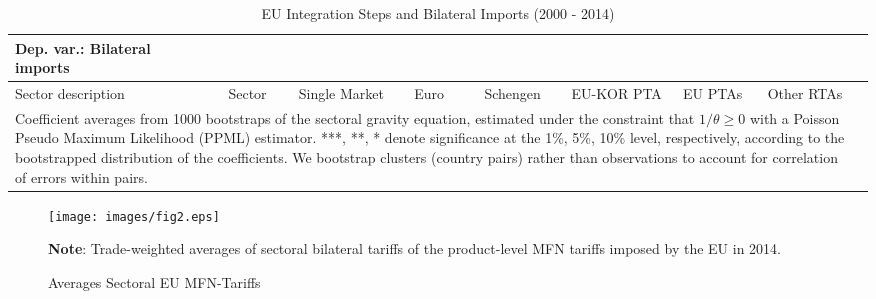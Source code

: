 \documentclass[a4paper,12pt]{article}
\begin{document}
\renewcommand{\tabcolsep}{.16cm}
\begin{table}[t!]
\caption{EU Integration Steps and Bilateral Imports (2000 - 2014)}
\label{table_sector}\centering \vspace*{0.5cm}
{\scriptsize
\hspace*{-0cm}\begin{tabular}{lcccccccc}
Dep. var.: Bilateral imports\\
\midrule
Sector description & Sector & Single Market & Euro & Schengen & EU-KOR PTA & EU PTAs & Other RTAs \\
\midrule

\midrule
\multicolumn{8}{l}{\parbox[t]{6.3in}{Coefficient averages from 1000 bootstraps of the sectoral gravity equation, estimated under the constraint that $1/\theta \geq 0$ with a Poisson Pseudo Maximum Likelihood (PPML) estimator.  ***, **, * denote significance at the 1\%, 5\%, 10\% level, respectively, according to the bootstrapped distribution of the coefficients. We bootstrap clusters (country pairs) rather than observations to account for correlation of errors within pairs. }}
\end{tabular}}
\end{table}


\begin{figure}[t!]
\centering
\caption{Averages Sectoral EU MFN-Tariffs}
\vspace{0.25cm}
\label{fig:ntb_tariffsEU}
\texttt{[image: images/fig2.eps]}
\begin{fignote}{\textwidth}{\scriptsize{\textbf{Note}: Trade-weighted averages of sectoral bilateral tariffs of the product-level MFN tariffs imposed by the EU in 2014.}}\end{fignote}
\end{figure}


\renewcommand{\tabcolsep}{.3cm}
\end{document}
